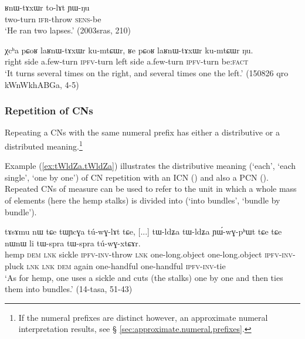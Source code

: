 \begin{exe}
\ex \label{ex:RnWtAxWr}
\gll ʁnɯ-tɤxɯr to-lɤt ɲɯ-ŋu \\
two-turn \textsc{ifr}-throw \textsc{sens}-be \\
\glt `He ran two lapses.' (2003sras, 210)
\end{exe}

\begin{exe}
\ex \label{ex:laRnWtAxWr}
\gll χcʰa pɕoʁ laʁnɯ-tɤxɯr ku-mtɕɯr, ʁe pɕoʁ laʁnɯ-tɤxɯr ku-mtɕɯr ŋu. \\
right side a.few-turn \textsc{ipfv}-turn left side a.few-turn \textsc{ipfv}-turn be:\textsc{fact} \\
\glt `It turns several times on the right, and several times one the left.' (150826 qro kWnWkhABGa, 4-5)
\end{exe}




\subsubsection{Repetition of CNs} \label{sec:CN.repetition}
Repeating a CNs with the same numeral prefix has either a distributive or a distributed meaning.\footnote{If the numeral prefixes are distinct however, an approximate numeral interpretation results, see § \ref{sec:approximate.numeral.prefixes}.}

Example (\ref{ex:tWldZa.tWldZa}) illustrates the distributive meaning (`each', `each single', `one by one') of CN repetition with an ICN () and also a PCN  (). Repeated CNs of measure can be used to refer to the unit in which a whole mass of elements (here the hemp stalks) is divided into (`into bundles', `bundle by bundle').

\begin{exe}
\ex \label{ex:tWldZa.tWldZa}
\gll  tɤsɤmu nɯ tɕe tɯɲcɣa tú-wɣ-lɤt tɕe, [...] tɯ-ldʑa tɯ-ldʑa ɲɯ́-wɣ-pʰɯt tɕe tɕe nɯnɯ li tɯ-spra tɯ-spra tú-wɣ-xtɕɤr. \\
hemp \textsc{dem} \textsc{lnk} sickle \textsc{ipfv}-\textsc{inv}-throw \textsc{lnk} { } one-long.object one-long.object \textsc{ipfv}-\textsc{inv}-pluck \textsc{lnk} \textsc{lnk} \textsc{dem} again one-handful one-handful \textsc{ipfv}-\textsc{inv}-tie  \\
\glt `As for hemp, one uses a sickle and cuts (the stalks) one by one and then ties them into bundles.'  (14-tasa, 51-43)
\end{exe}

